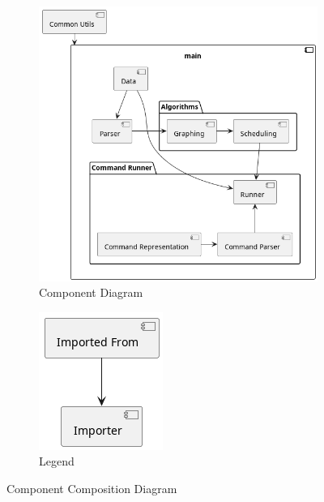 \documentclass[11pt]{article}
\begin{document}
\begin{figure}[h!]
  \centering
  \begin{subfigure}{0.5\linewidth}
    \includegraphics[width=\linewidth]{diags/components.png}
    \caption{\label{fig:comp}Component Diagram}
  \end{subfigure}
  \begin{subfigure}{0.15\linewidth}
    \includegraphics[width=\linewidth]{diags/comp_legend.png}
    \caption{\label{fig:comp}Legend}
  \end{subfigure}
  \caption{Component Composition Diagram}
\end{figure}
\end{document}
